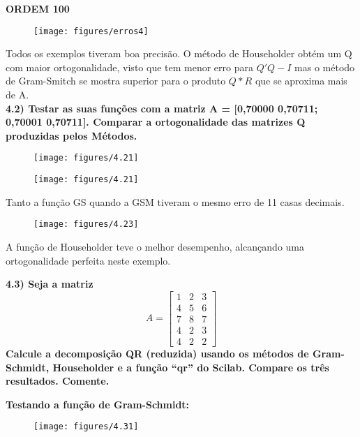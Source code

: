 \documentclass[leqno]{article}
\numberwithin{equation}{section}
\begin{document}
	\noindent \textbf{{\large ORDEM 100}}
	
	\begin{figure}[H]
		\centering
		\texttt{[image: figures/erros4]}		
	\end{figure}
	
	Todos os exemplos tiveram boa precisão. O método de Householder obtém um Q com maior ortogonalidade, visto que tem menor erro para $Q'Q - I$ mas o método de Gram-Smitch se mostra superior para o produto $Q*R$ que se aproxima mais de A.\\

	\newpage
	\textbf{{\large 4.2) Testar as suas funções com a matriz A = [0,70000 0,70711; 0,70001 0,70711].
	Comparar a ortogonalidade das matrizes Q produzidas pelos Métodos.}}

	\begin{figure}[H]
		\centering
		\texttt{[image: figures/4.21]}		
	\end{figure}

	\begin{figure}[H]
		\centering
		\texttt{[image: figures/4.21]}		
	\end{figure}

	Tanto a função GS quando a GSM tiveram o mesmo erro de 11 casas decimais.

	\begin{figure}[H]
		\centering
		\texttt{[image: figures/4.23]}		
	\end{figure}

	A função de Householder teve o melhor desempenho, alcançando uma ortogonalidade perfeita neste exemplo.


	\noindent \textbf{{\large 4.3) Seja a matriz $$A = \begin{bmatrix}
				1 & 2 & 3 \\
				4 & 5 & 6 \\
				7 & 8 & 7 \\
				4 & 2 & 3 \\
				4 & 2 & 2
			\end{bmatrix}$$ Calcule a decomposição QR (reduzida) usando os
	métodos de Gram-Schmidt, Householder e a função “qr” do Scilab. Compare os três
	resultados. Comente.}}
	
	\noindent \textbf{{\large Testando a função de Gram-Schmidt:}}
	\begin{figure}[H]
		\centering
		\texttt{[image: figures/4.31]}		
	\end{figure}
\end{document}
